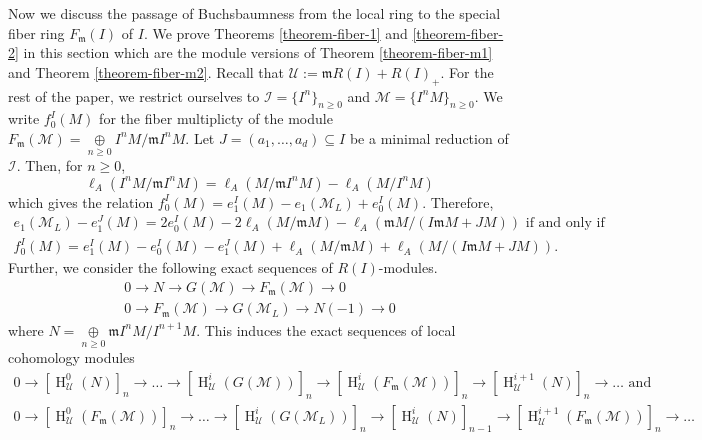 \documentclass[11pt,reqno]{amsart}
\theoremstyle{definition}
\newcommand{\m}{\mathfrak m}
\def\U{{\mathcal U}}
\def\M{{\mathcal M}}
\def\I{{\mathcal I}}
\DeclareMathOperator{\h}{H}
\numberwithin{equation}{section}
\begin{document}
Now we discuss the passage of Buchsbaumness from the local ring to the special fiber ring  $F_\m(I)$ of $I$.  We prove Theorems \ref{theorem-fiber-1} and \ref{theorem-fiber-2} in this section which are the module versions of Theorem 
\ref{theorem-fiber-m1} and Theorem \ref{theorem-fiber-m2}.  Recall that $\mathcal{U}:=\m R(I)+R(I)_+$.  For the rest of the paper,  we restrict ourselves to $\I=\{I^n\}_{n\geq0}$ and $\M=\{I^nM\}_{n\geq 0}$. We write $f_0^I(M)$ for the fiber multiplicty of the module $F_\m(\M)=\mathop\oplus\limits_{n\geq 0} I^nM/\m I^nM.$ Let
 $J=(a_1,\ldots,a_d)\subseteq I$ be a minimal reduction of $\I$. Then, for $n\geq 0$, $$\ell_A(I^nM/\m I^nM)=\ell_A(M/\m I^nM)-\ell_A(M/I^nM)$$  which gives the relation $f_0^I(M)=e_1^I(M)-e_1(\M_L)+e_0^I(M)$. Therefore, 
\begin{equation*}
	\begin{split}
		e_1(\M_L)-e_1^J(M)=2e_0^I(M)-2\ell_A(M/\m M)-\ell_A(\m M/(I\m M+JM))\mbox{ if and only if} \\
		f_0^I(M)= e_1^I(M)-e_0^I(M)-e_1^J(M)+\ell_A(M/\m M)+\ell_A(M/(I\m M+JM)). 
	\end{split}
\end{equation*}
Further, we consider the following exact sequences of $R(I)$-modules. 
\begin{eqnarray}
	0\to N\to G(\M)\to F_\m(\M)\to 0 \label{1st-exact-eqn}\\
	0\to F_\m(\M)\to G(\M_L)\to N(-1)\to 0\label{2nd-exact-eqn}
\end{eqnarray}
where $N=\mathop\oplus\limits_{n\geq 0}\m I^nM/I^{n+1}M$. This induces the exact sequences of local cohomology modules
\begin{eqnarray}
	0\to [\h^0_{\mathcal{U}}(N)]_n\to\ldots\to [\h^i_{\mathcal{U}}(G(\M))]_n\to [\h^i_{\U}(F_\m(\M))]_n\to [\h^{i+1}_{\U}(N)]_n\to\ldots \text{ and }\label{long-exact-seq-1}\\
	0\to[\h^0_{\U}(F_\m(\M))]_n\to\ldots
	\to [\h^i_{\mathcal{U}}(G(\M_L))]_n\to [\h^i_{\mathcal{U}}(N)]_{n-1}\to[\h^{i+1}_{\U}(F_\m(\M))]_n\to\ldots\label{long-exact-seq-2}
\end{eqnarray}
\end{document}
